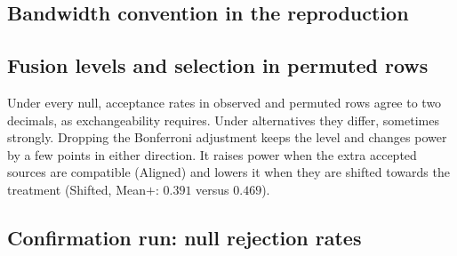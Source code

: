 \subsection{Bandwidth convention in the reproduction}

\begin{table}[H]
\centering\small
\caption{Original Table~2 rows with fixed bandwidth $s$, read as $k(x,y)=e^{-(x-y)^2/s^2}$ (i.e.\ $\sigma=s/\sqrt2$ in our parameterisation); $1000$ data sets per cell, frozen selection as in the original. ``original'' rows copy \citet[Table 2]{yang2026}: merge rates averaged over the three columns; PB with PP in the next column.}\label{tab:repro_bw}
\end{table}

\subsection{Fusion levels and selection in permuted rows}

\begin{table}[H]
\centering\scriptsize
\caption{Sourcewise fusion with Bonferroni levels (SW-R, $\alpha_{f,j}=0.05/3$) and without (SWu-R, $\alpha_{f,j}=0.05$), both with full reselection; acceptance rates of each source in the observed row and averaged over permuted rows (A\_main).}\label{tab:accrows}

\end{table}

Under every null, acceptance rates in observed and permuted rows agree to two decimals, as exchangeability requires. Under alternatives they differ, sometimes strongly. Dropping the Bonferroni adjustment keeps the level and changes power by a few points in either direction. It raises power when the extra accepted sources are compatible (Aligned) and lowers it when they are shifted towards the treatment (Shifted, Mean$+$: $0.391$ versus $0.469$).


\subsection{Confirmation run: null rejection rates}
\begin{table}[H]
\centering\scriptsize
\setlength{\tabcolsep}{3.2pt}
\caption{Null rejection rates in the confirmation run (A\_main, base seed $20261019$, $2000$ data sets per row).}\label{tab:nullconf}

\end{table}
